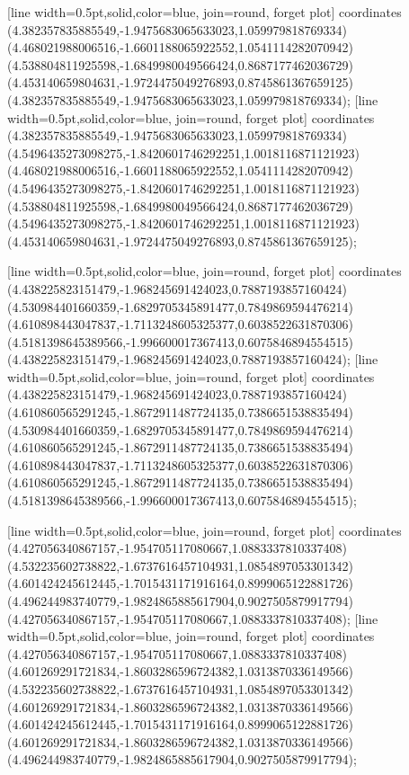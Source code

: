 [line width=0.5pt,solid,color=blue, join=round, forget plot] coordinates {(4.382357835885549,-1.9475683065633023,1.059979818769334) (4.468021988006516,-1.6601188065922552,1.0541114282070942) (4.538804811925598,-1.6849980049566424,0.8687177462036729) (4.453140659804631,-1.9724475049276893,0.8745861367659125) (4.382357835885549,-1.9475683065633023,1.059979818769334)};
[line width=0.5pt,solid,color=blue, join=round, forget plot] coordinates {(4.382357835885549,-1.9475683065633023,1.059979818769334) (4.5496435273098275,-1.8420601746292251,1.0018116871121923) (4.468021988006516,-1.6601188065922552,1.0541114282070942) (4.5496435273098275,-1.8420601746292251,1.0018116871121923) (4.538804811925598,-1.6849980049566424,0.8687177462036729) (4.5496435273098275,-1.8420601746292251,1.0018116871121923) (4.453140659804631,-1.9724475049276893,0.8745861367659125)};

[line width=0.5pt,solid,color=blue, join=round, forget plot] coordinates {(4.438225823151479,-1.968245691424023,0.7887193857160424) (4.530984401660359,-1.6829705345891477,0.7849869594476214) (4.610898443047837,-1.7113248605325377,0.6038522631870306) (4.5181398645389566,-1.996600017367413,0.6075846894554515) (4.438225823151479,-1.968245691424023,0.7887193857160424)};
[line width=0.5pt,solid,color=blue, join=round, forget plot] coordinates {(4.438225823151479,-1.968245691424023,0.7887193857160424) (4.610860565291245,-1.8672911487724135,0.7386651538835494) (4.530984401660359,-1.6829705345891477,0.7849869594476214) (4.610860565291245,-1.8672911487724135,0.7386651538835494) (4.610898443047837,-1.7113248605325377,0.6038522631870306) (4.610860565291245,-1.8672911487724135,0.7386651538835494) (4.5181398645389566,-1.996600017367413,0.6075846894554515)};

[line width=0.5pt,solid,color=blue, join=round, forget plot] coordinates {(4.427056340867157,-1.954705117080667,1.0883337810337408) (4.532235602738822,-1.6737616457104931,1.0854897053301342) (4.601424245612445,-1.7015431171916164,0.8999065122881726) (4.496244983740779,-1.9824865885617904,0.9027505879917794) (4.427056340867157,-1.954705117080667,1.0883337810337408)};
[line width=0.5pt,solid,color=blue, join=round, forget plot] coordinates {(4.427056340867157,-1.954705117080667,1.0883337810337408) (4.601269291721834,-1.8603286596724382,1.0313870336149566) (4.532235602738822,-1.6737616457104931,1.0854897053301342) (4.601269291721834,-1.8603286596724382,1.0313870336149566) (4.601424245612445,-1.7015431171916164,0.8999065122881726) (4.601269291721834,-1.8603286596724382,1.0313870336149566) (4.496244983740779,-1.9824865885617904,0.9027505879917794)};

